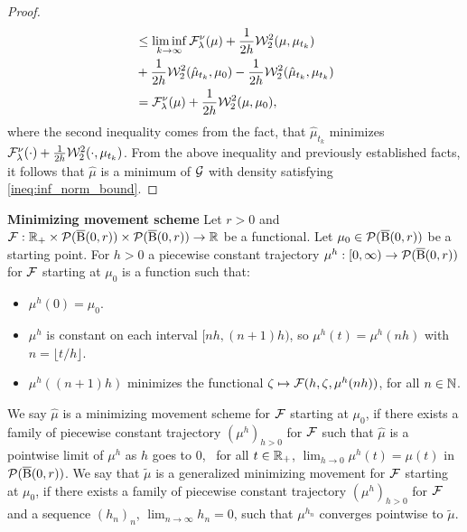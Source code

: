 \begin{proof}
\[\begin{aligned}
& \leq \liminf_{k \rightarrow \infty}  \mathcal{F}^{\nu}_{\lambda}(\mu) + \frac{1}{2h} {\cal W}_2^2(\mu , \mu_{t_k})   \\
& + \frac{1}{2h}  {\cal W}_2^2(\hat{\mu}_{t_k}, \mu_0) - \frac{1}{2h} {\cal W}_2^2(\hat{\mu}_{t_k}, \mu_{t_k})   \\
& = \mathcal{F}^{\nu}_{\lambda} (\mu) + \frac{1}{2h} {\cal W}_2^2(\mu, \mu_0) ,
\end{aligned}
\]
where the second inequality comes from the fact, that $\hat{\mu}_{t_k}$ minimizes $\mathcal{F}^{\nu}_{\lambda}(\cdot) + \frac{1}{2h}{\cal W}_2^2(\cdot, \mu_{t_k})$. From the above inequality and previously established facts, it follows that $\hat{\mu}$ is a minimum of $\mathcal{G}$ with density satisfying \ref{ineq:inf_norm_bound}.
\end{proof}

\begin{definition} \textbf{Minimizing movement scheme}
  \label{def:mini_move}
Let $r >0$ and  $\mathcal{F} : \mathbb{R_+} \times {\cal P}(\operatorname{\overline{B}}(0,r)) \times {\cal P}(\operatorname{\overline{B}}(0,r))\rightarrow \mathbb{R}$ be a functional. Let $\mu_0 \in {\cal P}(\operatorname{\overline{B}}(0,r))$ be a starting point. For $h> 0$ a piecewise constant trajectory $\mu^h : [0, \infty) \rightarrow {\cal P}(\operatorname{\overline{B}}(0,r))$ for $\mathcal{F}$ starting at $\mu_0$ is a function such that:
\begin{itemize}
\item $\mu^h(0) = \mu_0$.
\item $\mu^h$ is constant on each interval $[nh, (n+1)h)$, so $\mu^h(t) = \mu^h(nh)$ with $n = \lfloor t/h \rfloor$.
\item $\mu^h((n+1)h )$ minimizes the  functional $ \zeta  \mapsto \mathcal{F}(h,  \zeta ,\mu^h(nh))$, for all $n \in \mathbb{N}$.
\end{itemize}
We say $\hat{\mu}$ is a minimizing movement scheme for $\mathcal{F}$ starting at $\mu_0$, if there exists a family of piecewise constant trajectory $(\mu^h)_{h >0}$ for $\mathcal{F}$ such that $\hat{\mu}$ is a pointwise limit of $\mu^h$ as $h$ goes to $0$, \ie~for all $t \in \mathbb{R}_+$, $\lim_{h \to 0} \mu^h(t) = \mu(t)$ in ${\cal P}(\operatorname{\overline{B}}(0,r))$. We say that $\tilde{\mu}$ is a generalized minimizing movement for  $\mathcal{F}$ starting at $\mu_0$, if there exists a family of piecewise constant trajectory $(\mu^h)_{h >0}$ for $\mathcal{F}$ and  a sequence $(h_n)_n$, $\lim_{n \to \infty} h_n = 0$, such that $\mu^{h_n}$ converges pointwise to $\tilde{\mu}$.
\end{definition}



